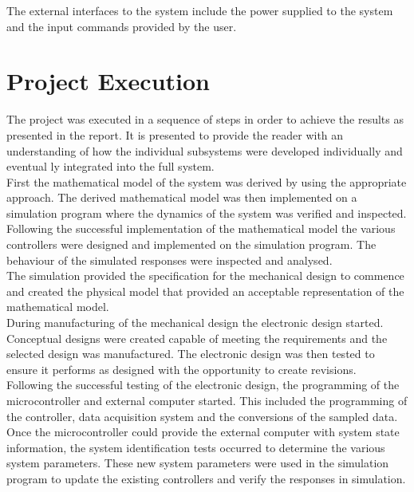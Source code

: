 The external interfaces to the system include the power supplied to the system and the input commands provided by the user.

\section{Project Execution}

The project was executed in a sequence of steps in order to achieve the results as presented in the report. It is presented to provide the reader with an understanding of how the individual subsystems were developed individually and eventual	ly integrated into the full system.\\
 
First the mathematical model of the system was derived by using the appropriate approach. The derived mathematical model was then implemented on a simulation program where the dynamics of the system was verified and inspected.\\

Following the successful implementation of the mathematical model the various controllers were designed and implemented on the simulation program. The behaviour of the simulated responses were inspected and analysed.\\

The simulation provided the specification for the mechanical design to commence and created the physical model that provided an acceptable representation of the mathematical model.\\

During manufacturing of the mechanical design the electronic design started. Conceptual designs were created capable of meeting the requirements and the selected design was manufactured. The electronic design was then tested to ensure it performs as designed with the opportunity to create revisions.\\

Following the successful testing of the electronic design, the programming of the microcontroller and external computer started. This included the programming of the controller, data acquisition system and the conversions of the sampled data.\\

Once the microcontroller could provide the external computer with system state information, the system identification tests occurred to determine the various system parameters. These new system parameters were used in the simulation program to update the existing controllers and verify the responses in simulation.\\

